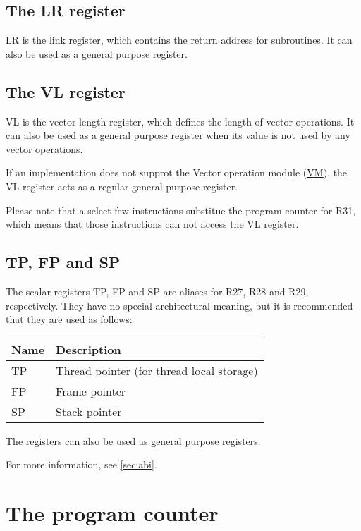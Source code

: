 \subsection{The LR register}

LR is the link register, which contains the return address for subroutines. It
can also be used as a general purpose register.

\subsection{The VL register}

VL is the vector length register, which defines the length of vector
operations. It can also be used as a general purpose register when its value
is not used by any vector operations.

If an implementation does not supprot the Vector operation module
(\hyperref[module:VM]{VM}), the VL register acts as a regular general purpose
register.

Please note that a select few instructions substitue the program counter for
R31, which means that those instructions can not access the VL register.

\subsection{TP, FP and SP}

The scalar registers TP, FP and SP are aliases for R27, R28 and R29,
respectively. They have no special architectural meaning, but it is recommended
that they are used as follows:

\begin{tabular}{|l|l|}
  \hline
  \textbf{Name} & \textbf{Description} \\
  \hline
  TP & Thread pointer (for thread local storage) \\
  \hline
  FP & Frame pointer \\
  \hline
  SP & Stack pointer \\
  \hline
\end{tabular}

The registers can also be used as general purpose registers.

For more information, see \ref{sec:abi}.

\section{The program counter}


